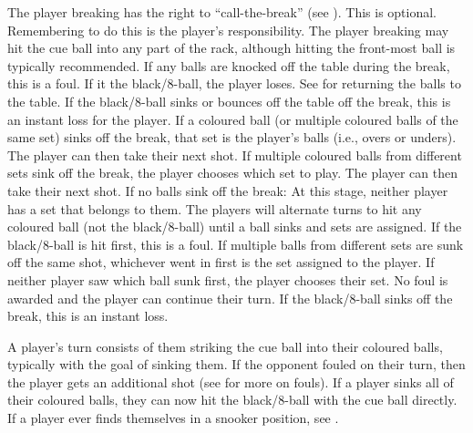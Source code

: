  \CueBallPlacement%
 The player breaking has the right to “call-the-break” (see ). This is optional. Remembering to do this is the player's responsibility.%
The player breaking may hit the cue ball into any part of the rack, although hitting the front-most ball is typically recommended.%
 {}%
 \CueBallRailOffBreak%
 \CueBallSinkOffBreak%
 If any balls are knocked off the table during the break, this is a foul. If it the black/8-ball, the player loses. See  for returning the balls to the table.%
 If the black/8-ball sinks or bounces off the table off the break, this is an instant loss for the player.%
 If a coloured ball (or multiple coloured balls of the same set) sinks off the break, that set is the player's balls (i.e., overs or unders). The player can then take their next shot.%
 If multiple coloured balls from different sets sink off the break, the player chooses which set to play. The player can then take their next shot.%
If no balls sink off the break:%
\subruleitem At this stage, neither player has a set that belongs to them. The players will alternate turns to hit any coloured ball (not the black/8-ball) until a ball sinks and sets are assigned.%
\subruleitem If the black/8-ball is hit first, this is a foul.%
\subruleitem If multiple balls from different sets are sunk off the same shot, whichever went in first is the set assigned to the player. If neither player saw which ball sunk first, the player chooses their set. No foul is awarded and the player can continue their turn.%
 If the black/8-ball sinks off the break, this is an instant loss.%


 A player's turn consists of them striking the cue ball into their coloured balls, typically with the goal of sinking them.%
 \FootOnGround%
 If the opponent fouled on their turn, then the player gets an additional shot (see  for more on fouls).%
 If a player sinks all of their coloured balls, they can now hit the black/8-ball with the cue ball directly.%
 If a player ever finds themselves in a snooker position, see .%
 {}%


